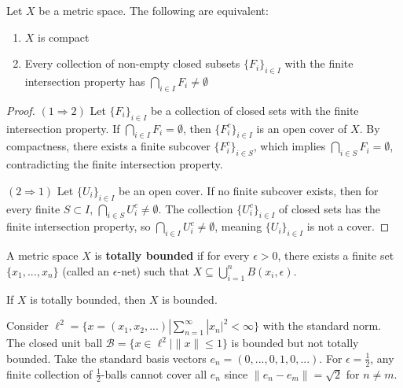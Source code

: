 \documentclass{functionspaces}
\begin{document}
\begingroup
\setlength{\parskip}{6pt}
\setlength{\parindent}{0pt}

\begin{proposition}
Let $X$ be a metric space. The following are equivalent:
\begin{enumerate}
\item $X$ is compact
\item Every collection of non-empty closed subsets $\{F_i\}_{i\in I}$ with the finite intersection property has $\bigcap_{i\in I}F_i \neq \emptyset$
\end{enumerate}
\end{proposition}

\begin{proof}
$(1 \Rightarrow 2)$ Let $\{F_i\}_{i\in I}$ be a collection of closed sets with the finite intersection property. If $\bigcap_{i\in I}F_i = \emptyset$, then $\{F_i^c\}_{i\in I}$ is an open cover of $X$. By compactness, there exists a finite subcover $\{F_i^c\}_{i\in S}$, which implies $\bigcap_{i\in S}F_i = \emptyset$, contradicting the finite intersection property.

$(2 \Rightarrow 1)$ Let $\{U_i\}_{i\in I}$ be an open cover. If no finite subcover exists, then for every finite $S \subset I$, $\bigcap_{i\in S}U_i^c \neq \emptyset$. The collection $\{U_i^c\}_{i\in I}$ of closed sets has the finite intersection property, so $\bigcap_{i\in I}U_i^c \neq \emptyset$, meaning $\{U_i\}_{i\in I}$ is not a cover.
\end{proof}

\begin{definition}
A metric space $X$ is \textbf{totally bounded} if for every $\epsilon > 0$, there exists a finite set $\{x_1,...,x_n\}$ (called an $\epsilon$-net) such that $X \subseteq \bigcup_{i=1}^n B(x_i,\epsilon)$.
\end{definition}

\begin{proposition}
If $X$ is totally bounded, then $X$ is bounded.
\end{proposition}

\begin{example}
Consider $\ell^2 = \{x = (x_1,x_2,...) | \sum_{n=1}^\infty |x_n|^2 < \infty\}$ with the standard norm. The closed unit ball $\mathcal{B} = \{x \in \ell^2 | \|x\| \leq 1\}$ is bounded but not totally bounded. Take the standard basis vectors $e_n = (0,...,0,1,0,...)$. For $\epsilon = \frac{1}{2}$, any finite collection of $\frac{1}{2}$-balls cannot cover all $e_n$ since $\|e_n - e_m\| = \sqrt{2}$ for $n \neq m$.
\end{example}
\end{document}
